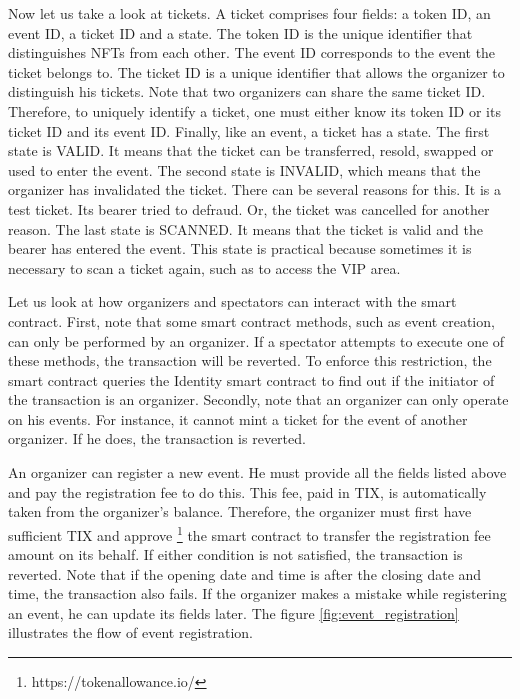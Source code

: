 \documentclass[a4paper,11pt,oneside]{report}
\begin{document}
Now let us take a look at tickets. A ticket comprises four fields: a token ID, an event ID, a ticket ID and a state. The token ID is the unique identifier that distinguishes NFTs from each other. The event ID corresponds to the event the ticket belongs to. The ticket ID is a unique identifier that allows the organizer to distinguish his tickets. Note that two organizers can share the same ticket ID. Therefore, to uniquely identify a ticket, one must either know its token ID or its ticket ID and its event ID. Finally, like an event, a ticket has a state. The first state is VALID. It means that the ticket can be transferred, resold, swapped or used to enter the event. The second state is INVALID, which means that the organizer has invalidated the ticket. There can be several reasons for this. It is a test ticket. Its bearer tried to defraud. Or, the ticket was cancelled for another reason. The last state is SCANNED. It means that the ticket is valid and the bearer has entered the event. This state is practical because sometimes it is necessary to scan a ticket again, such as to access the VIP area.

Let us look at how organizers and spectators can interact with the smart contract. First, note that some smart contract methods, such as event creation, can only be performed by an organizer. If a spectator attempts to execute one of these methods, the transaction will be reverted. To enforce this restriction, the smart contract queries the Identity smart contract to find out if the initiator of the transaction is an organizer. Secondly, note that an organizer can only operate on his events. For instance, it cannot mint a ticket for the event of another organizer. If he does, the transaction is reverted.

An organizer can register a new event. He must provide all the fields listed above and pay the registration fee to do this. This fee, paid in TIX, is automatically taken from the organizer's balance. Therefore, the organizer must first have sufficient TIX and approve \footnote{https://tokenallowance.io/} the smart contract to transfer the registration fee amount on its behalf. If either condition is not satisfied, the transaction is reverted. Note that if the opening date and time is after the closing date and time, the transaction also fails. If the organizer makes a mistake while registering an event, he can update its fields later. The figure \hyperref[fig:event_registration]{\ref{fig:event_registration}} illustrates the flow of event registration.
\end{document}
